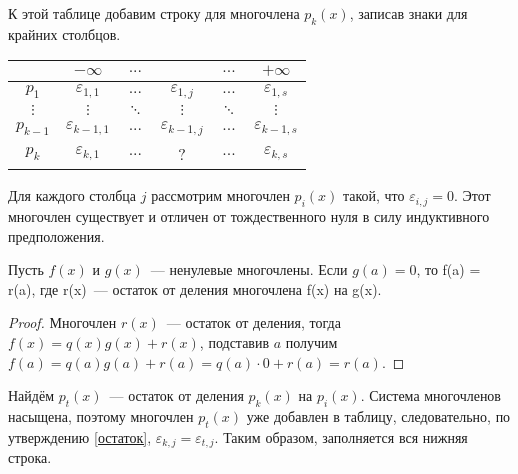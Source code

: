 К этой таблице добавим строку для многочлена $p_{k}(x)$, записав знаки для крайних столбцов.
\begin{center}
    \begin{tabular}{ |c|c|c|c|c|c| } 
    \hline
                 & $-\infty$ & $...$ &  & $...$ & $+\infty$ \\ 
    \hline
        $p_1$ & $\varepsilon_{1, 1}$ & $...$ & $\varepsilon_{1, j}$ & $...$ & $\varepsilon_{1, s}$\\ 
    \hline
        $\vdots$ & $\vdots$ & $\ddots$ & $\vdots$ & $\ddots$ & $\vdots$ \\
    \hline
        $p_{k-1}$ & $\varepsilon_{k-1, 1}$ & $...$ & $\varepsilon_{k-1, j}$ & $...$ & $\varepsilon_{k-1, s}$\\    
    \hline
        $p_{k}$ & $\varepsilon_{k, 1}$ & $...$ & $ $?$ $ & $...$ & $\varepsilon_{k, s}$\\    
    \hline
    \end{tabular}
\end{center}
Для каждого столбца $j$ рассмотрим многочлен $p_i(x)$ такой, что $\varepsilon_{i, j} = 0$. Этот многочлен существует и отличен от тождественного нуля в силу индуктивного предположения.
\begin{proposal}\label{остаток}
    Пусть $f(x)$ и $g(x)$~--- ненулевые многочлены. Если $g(a) = 0$, то f(a) = r(a), где r(x)~--- остаток от деления многочлена f(x) на g(x).
\end{proposal}
\begin{proof}
    Многочлен $r(x)$~--- остаток от деления, тогда $f(x) = q(x)g(x) + r(x)$, подставив $a$ получим $f(a) = q(a)g(a) + r(a) = q(a)\cdot 0 + r(a) = r(a)$.
\end{proof}

Найдём $p_t(x)$~--- остаток от деления $p_k(x)$ на $p_i(x)$. Система многочленов насыщена, поэтому многочлен $p_t(x)$ уже добавлен в таблицу, следовательно, по утверждению \ref{остаток}, $\varepsilon_{k, j} = \varepsilon_{t, j}$. Таким образом, заполняется вся нижняя строка.

